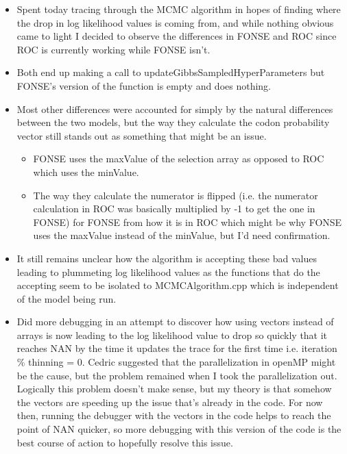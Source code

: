 \documentclass[11pt]{labbook}
\begin{document}
    \begin{itemize}
        \item Spent today tracing through the MCMC algorithm in hopes of finding where the drop in log likelihood values is coming from, and while nothing obvious came to light I decided to observe the differences in FONSE and ROC since ROC is currently working while FONSE isn't.
        \item Both end up making a call to updateGibbsSampledHyperParameters but FONSE's version of the function is empty and does nothing.
        \item Most other differences were accounted for simply by the natural differences between the two models, but the way they calculate the codon probability vector still stands out as something that might be an issue.
        \begin{itemize}
            \item FONSE uses the maxValue of the selection array as opposed to ROC which uses the minValue.
            \item The way they calculate the numerator is flipped (i.e. the numerator calculation in ROC was basically multiplied by -1 to get the one in FONSE) for FONSE from how it is in ROC which might be why FONSE uses the maxValue instead of the minValue, but I'd need confirmation.
        \end{itemize}
        \item It still remains unclear how the algorithm is accepting these bad values leading to plummeting log likelihood values as the functions that do the accepting seem to be isolated to MCMCAlgorithm.cpp which is independent of the model being run.
        \item Did more debugging in an attempt to discover how using vectors instead of arrays is now leading to the log likelihood value to drop so quickly that it reaches NAN by the time it updates the trace for the first time i.e. iteration \%  thinning = 0. Cedric suggested that the parallelization in openMP might be the cause, but the problem remained when I took the parallelization out. Logically this problem doesn't make sense, but my theory is that somehow the vectors are speeding up the issue that's already in the code. For now then, running the debugger with the vectors in the code helps to reach the point of NAN quicker, so more debugging with this version of the code is the best course of action to hopefully resolve this issue.
    \end{itemize}
    
\end{document}
